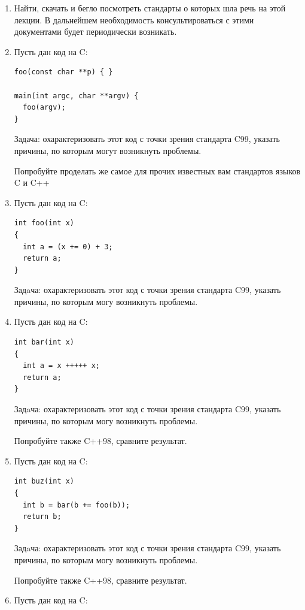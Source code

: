 \documentclass[a4paper,12pt,oneside]{book}
\begin{document}
\begin{enumerate}
\item
Найти, скачать и бегло посмотреть стандарты о которых шла речь на этой лекции. В дальнейшем необходимость консультироваться с этими документами будет периодически возникать.
\item
Пусть дан код на C:

\begin{lstlisting}
foo(const char **p) { }

main(int argc, char **argv) {
  foo(argv);
}
\end{lstlisting}

Задача: охарактеризовать этот код с точки зрения стандарта C99, указать причины, по которым могут возникнуть проблемы.

Попробуйте проделать же самое для прочих известных вам стандартов языков C и C++

\item
Пусть дан код на C:

\begin{lstlisting}
int foo(int x) 
{
  int a = (x += 0) + 3;
  return a;
}
\end{lstlisting}

Задaча: охарактеризовать этот код с точки зрения стандарта C99, указать причины, по которым могу возникнуть проблемы.

\item
Пусть дан код на C:

\begin{lstlisting}
int bar(int x) 
{
  int a = x +++++ x;
  return a;
}
\end{lstlisting}

Задaча: охарактеризовать этот код с точки зрения стандарта C99, указать причины, по которым могу возникнуть проблемы.

Попробуйте также C++98, сравните результат.

\item
Пусть дан код на C:

\begin{lstlisting}
int buz(int x) 
{
  int b = bar(b += foo(b));
  return b;
}
\end{lstlisting}

Задaча: охарактеризовать этот код с точки зрения стандарта C99, указать причины, по которым могу возникнуть проблемы. 

Попробуйте также C++98, сравните результат.

\item
Пусть дан код на C:


\end{enumerate}
\end{document}
